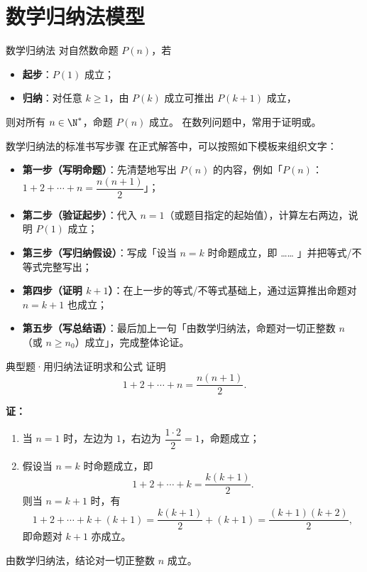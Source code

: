 \documentclass[a4paper,11pt]{ctexart}
\begin{document}
\clearpage
\section{数学归纳法模型}

\begin{definitionbox}{数学归纳法}
  对自然数命题 $P(n)$，若
  \begin{itemize}
    \item \textbf{起步}：$P(1)$ 成立；
    \item \textbf{归纳}：对任意 $k\ge1$，由 $P(k)$ 成立可推出 $P(k+1)$ 成立，
  \end{itemize}
  则对所有 $n\in\N^*$，命题 $P(n)$ 成立。
  在数列问题中，常用于证明或。
\end{definitionbox}

\begin{notebox}{数学归纳法的标准书写步骤}
  在正式解答中，可以按照如下模板来组织文字：
  \begin{itemize}
    \item \textbf{第一步（写明命题）}：先清楚地写出 $P(n)$ 的内容，例如「$P(n)$：$1+2+\cdots+n=\dfrac{n(n+1)}{2}$」；
    \item \textbf{第二步（验证起步）}：代入 $n=1$（或题目指定的起始值），计算左右两边，说明 $P(1)$ 成立；
    \item \textbf{第三步（写归纳假设）}：写成「设当 $n=k$ 时命题成立，即 …… 」并把等式/不等式完整写出；
    \item \textbf{第四步（证明 $k+1$）}：在上一步的等式/不等式基础上，通过运算推出命题对 $n=k+1$ 也成立；
    \item \textbf{第五步（写总结语）}：最后加上一句「由数学归纳法，命题对一切正整数 $n$（或 $n\ge n_0$）成立」，完成整体论证。
  \end{itemize}
\end{notebox}

\begin{examplebox}{典型题·用归纳法证明求和公式}
  证明
  \[
    1+2+\cdots+n=\frac{n(n+1)}{2}.
  \]

  \textbf{证：}
  \begin{enumerate}
    \item 当 $n=1$ 时，左边为 $1$，右边为 $\dfrac{1\cdot2}{2}=1$，命题成立；
    \item 假设当 $n=k$ 时命题成立，即
    \[
      1+2+\cdots+k=\frac{k(k+1)}{2}.
    \]
    则当 $n=k+1$ 时，有
    \[
      1+2+\cdots+k+(k+1)=\frac{k(k+1)}{2}+(k+1)
      =\frac{(k+1)(k+2)}{2},
    \]
    即命题对 $k+1$ 亦成立。
  \end{enumerate}
  由数学归纳法，结论对一切正整数 $n$ 成立。
\end{examplebox}
\end{document}
